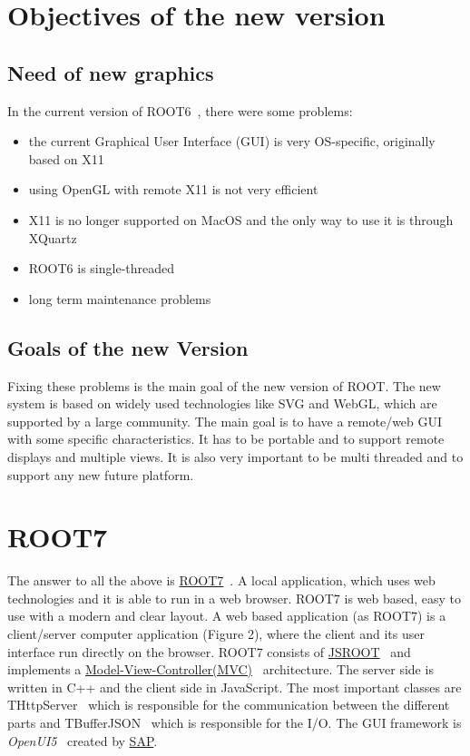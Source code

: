 \documentclass[a4paper]{jpconf}
\begin{document}
\section{Objectives of the new version}

\subsection{Need of new graphics}
In the current version of ROOT6~\cite{root6}, there were some problems:
\begin{itemize}
  \item the current Graphical User Interface (GUI) is very {OS-specific}, originally based on X11
  \item using OpenGL with remote X11 is not very efficient
  \item X11 is no longer supported on MacOS and the only way to use it is through XQuartz~\cite{x11}
  \item ROOT6 is single-threaded
  \item long term maintenance problems
\end{itemize}

\subsection{Goals of the new Version}
Fixing these problems is the main goal of the new version of ROOT. The new system is based on widely used technologies like SVG and WebGL, which are supported by a large community. The main goal is to have a remote/web GUI with some specific characteristics. It has to be portable and to support remote displays and multiple views. It is also very important to be multi threaded and to support any new future platform.

\section{ROOT7}

The answer to all the above is \href{https://root.cern.ch/root-7}{ROOT7}~\cite{root7}. A local application, which uses web technologies and it is able to run in a web browser. ROOT7 is web based, easy to use with a modern and clear layout.
%
A web based application (as ROOT7) is a client/server computer application (Figure 2), where the client and its user interface run directly on the browser. ROOT7 consists of \href{https://root.cern.ch/js/}{JSROOT}~\cite{jsroot} and implements a \href{https://en.wikipedia.org/wiki/Model%E2%80%93view%E2%80%93controller}{Model-View-Controller(MVC)}~\cite{mvc} architecture. The server side is written in C++ and the client side in JavaScript.
The most important classes are THttpServer~\cite{http} which is responsible for the communication between the different parts and TBufferJSON~\cite{buffer} which is responsible for the I/O. The GUI framework is \textit{OpenUI5}~\cite{openui} created by \href{https://www.sap.com/index.html}{SAP}.
\end{document}
